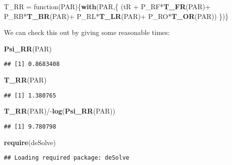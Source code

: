 \documentclass[]{article}
\newenvironment{Shaded}{\begin{snugshade}}{\end{snugshade}}
\newcommand{\KeywordTok}[1]{\textcolor[rgb]{0.13,0.29,0.53}{\textbf{{#1}}}}
\newcommand{\StringTok}[1]{\textcolor[rgb]{0.31,0.60,0.02}{{#1}}}
\newcommand{\NormalTok}[1]{{#1}}
\begin{document}
\begin{Shaded}
\begin{Highlighting}[]
\NormalTok{T_RR =}\StringTok{ }\NormalTok{function(PAR)\{}\KeywordTok{with}\NormalTok{(PAR,\{}
  \NormalTok{(tR +}
\StringTok{  }\NormalTok{P_RF*}\KeywordTok{T_FR}\NormalTok{(PAR)+}
\StringTok{  }\NormalTok{P_RB*}\KeywordTok{T_BR}\NormalTok{(PAR)+}
\StringTok{  }\NormalTok{P_RL*}\KeywordTok{T_LR}\NormalTok{(PAR)+}
\StringTok{  }\NormalTok{P_RO*}\KeywordTok{T_OR}\NormalTok{(PAR))}
\NormalTok{\})\}}
\end{Highlighting}
\end{Shaded}

We can check this out by giving some reasonable times:

\begin{Shaded}
\begin{Highlighting}[]
\KeywordTok{Psi_RR}\NormalTok{(PAR)}
\end{Highlighting}
\end{Shaded}

\begin{verbatim}
## [1] 0.8683408
\end{verbatim}

\begin{Shaded}
\begin{Highlighting}[]
\KeywordTok{T_RR}\NormalTok{(PAR)}
\end{Highlighting}
\end{Shaded}

\begin{verbatim}
## [1] 1.380765
\end{verbatim}

\begin{Shaded}
\begin{Highlighting}[]
\KeywordTok{T_RR}\NormalTok{(PAR)/-}\KeywordTok{log}\NormalTok{(}\KeywordTok{Psi_RR}\NormalTok{(PAR))}
\end{Highlighting}
\end{Shaded}

\begin{verbatim}
## [1] 9.780798
\end{verbatim}

\begin{Shaded}
\begin{Highlighting}[]
\KeywordTok{require}\NormalTok{(deSolve)}
\end{Highlighting}
\end{Shaded}

\begin{verbatim}
## Loading required package: deSolve
\end{verbatim}
\end{document}
